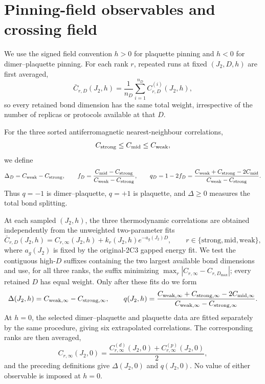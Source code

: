 \documentclass[10pt]{article}
\begin{document}
\section*{Pinning-field observables and crossing field}

We use the signed field convention $h>0$ for plaquette pinning and $h<0$
for dimer--plaquette pinning.  For each rank $r$, repeated runs at fixed
$(J_2,D,h)$ are first averaged,
\begin{equation}
 \bar C_{r,D}(J_2,h)=\frac{1}{n_D}\sum_{i=1}^{n_D}C^{(i)}_{r,D}(J_2,h),
\end{equation}
so every retained bond dimension has the same total weight, irrespective of
the number of replicas or protocols available at that $D$.

For the three sorted antiferromagnetic nearest-neighbour correlations,
\begin{equation}
 C_{\rm strong}\le C_{\rm mid}\le C_{\rm weak},
\end{equation}
we define
\begin{equation}
 \Delta_D=C_{\rm weak}-C_{\rm strong},\qquad
 f_D=\frac{C_{\rm mid}-C_{\rm strong}}
           {C_{\rm weak}-C_{\rm strong}},\qquad
 q_D=1-2f_D
 =\frac{C_{\rm weak}+C_{\rm strong}-2C_{\rm mid}}
        {C_{\rm weak}-C_{\rm strong}}.
\end{equation}
Thus $q=-1$ is dimer--plaquette, $q=+1$ is plaquette, and $\Delta\ge0$
measures the total bond splitting.

At each sampled $(J_2,h)$, the three thermodynamic correlations are obtained
independently from the unweighted two-parameter fits
\begin{equation}
 \bar C_{r,D}(J_2,h)
 =C_{r,\infty}(J_2,h)+k_r(J_2,h)e^{-a_g(J_2)D},
 \qquad r\in\{\mathrm{strong},\mathrm{mid},\mathrm{weak}\},
\end{equation}
where $a_g(J_2)$ is fixed by the original-2C3 gapped energy fit.  We test the
contiguous high-$D$ suffixes containing the two largest available bond
dimensions and use, for all three ranks, the suffix minimizing
$\max_r|C_{r,\infty}-C_{r,D_{\max}}|$; every retained $D$ has equal weight.
Only after these fits do we form
\begin{equation}
 \Delta(J_2,h)=C_{\rm weak,\infty}-C_{\rm strong,\infty},\qquad
 q(J_2,h)=
 \frac{C_{\rm weak,\infty}+C_{\rm strong,\infty}
       -2C_{\rm mid,\infty}}
      {C_{\rm weak,\infty}-C_{\rm strong,\infty}}.
\end{equation}
At $h=0$, the selected dimer--plaquette and plaquette data are fitted
separately by the same procedure, giving six extrapolated correlations.  The
corresponding ranks are then averaged,
\begin{equation}
 C_{r,\infty}(J_2,0)=\frac{C^{(d)}_{r,\infty}(J_2,0)
                              +C^{(p)}_{r,\infty}(J_2,0)}{2},
\end{equation}
and the preceding definitions give $\Delta(J_2,0)$ and $q(J_2,0)$.  No value
of either observable is imposed at $h=0$.
\end{document}
